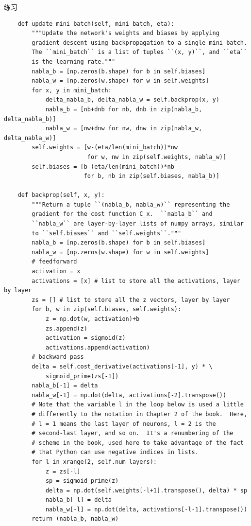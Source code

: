 \begin{exerciseBox}{练习}
\begin{lstlisting}
    def update_mini_batch(self, mini_batch, eta):
        """Update the network's weights and biases by applying
        gradient descent using backpropagation to a single mini batch.
        The ``mini_batch`` is a list of tuples ``(x, y)``, and ``eta``
        is the learning rate."""
        nabla_b = [np.zeros(b.shape) for b in self.biases]
        nabla_w = [np.zeros(w.shape) for w in self.weights]
        for x, y in mini_batch:
            delta_nabla_b, delta_nabla_w = self.backprop(x, y)
            nabla_b = [nb+dnb for nb, dnb in zip(nabla_b, delta_nabla_b)]
            nabla_w = [nw+dnw for nw, dnw in zip(nabla_w, delta_nabla_w)]
        self.weights = [w-(eta/len(mini_batch))*nw
                        for w, nw in zip(self.weights, nabla_w)]
        self.biases = [b-(eta/len(mini_batch))*nb
                       for b, nb in zip(self.biases, nabla_b)]

    def backprop(self, x, y):
        """Return a tuple ``(nabla_b, nabla_w)`` representing the
        gradient for the cost function C_x.  ``nabla_b`` and
        ``nabla_w`` are layer-by-layer lists of numpy arrays, similar
        to ``self.biases`` and ``self.weights``."""
        nabla_b = [np.zeros(b.shape) for b in self.biases]
        nabla_w = [np.zeros(w.shape) for w in self.weights]
        # feedforward
        activation = x
        activations = [x] # list to store all the activations, layer by layer
        zs = [] # list to store all the z vectors, layer by layer
        for b, w in zip(self.biases, self.weights):
            z = np.dot(w, activation)+b
            zs.append(z)
            activation = sigmoid(z)
            activations.append(activation)
        # backward pass
        delta = self.cost_derivative(activations[-1], y) * \
            sigmoid_prime(zs[-1])
        nabla_b[-1] = delta
        nabla_w[-1] = np.dot(delta, activations[-2].transpose())
        # Note that the variable l in the loop below is used a little
        # differently to the notation in Chapter 2 of the book.  Here,
        # l = 1 means the last layer of neurons, l = 2 is the
        # second-last layer, and so on.  It's a renumbering of the
        # scheme in the book, used here to take advantage of the fact
        # that Python can use negative indices in lists.
        for l in xrange(2, self.num_layers):
            z = zs[-l]
            sp = sigmoid_prime(z)
            delta = np.dot(self.weights[-l+1].transpose(), delta) * sp
            nabla_b[-l] = delta
            nabla_w[-l] = np.dot(delta, activations[-l-1].transpose())
        return (nabla_b, nabla_w)


\end{lstlisting}
\end{exerciseBox}

